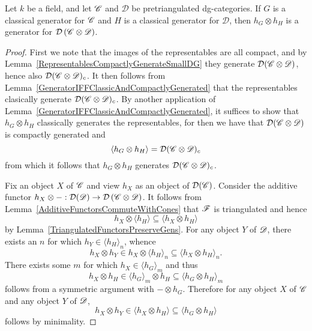 \documentclass[dissertation.tex]{subfiles}
\begin{document}
\begin{thm}
  Let $k$ be a field, and let $\mathscr{C}$ and $\mathscr{D}$ be pretriangulated dg-categories.
  If $G$ is a classical generator for $\mathscr{C}$ and $H$ is a classical generator for $\mathscr{D}$, then $h_G \otimes h_H$ is a generator for $\mathcal{D}\left(\mathscr{C} \otimes \mathscr{D}\right)$.
  
  \begin{proof}
    First we note that the images of the representables are all compact, and by Lemma~\ref{RepresentablesCompactlyGenerateSmallDG} they generate $\mathcal{D}(\mathscr{C} \otimes \mathscr{D})$, hence also $\mathcal{D}(\mathscr{C} \otimes \mathscr{D})_c$.
    It then follows from Lemma~\ref{GeneratorIFFClassicAndCompactlyGenerated} that the representables clasically generate $\mathcal{D}(\mathscr{C} \otimes \mathscr{D})_c$.
    By another application of Lemma~\ref{GeneratorIFFClassicAndCompactlyGenerated}, it suffices to show that $h_G \otimes h_H$ classically generates the representables, for then we have that $\mathcal{D}(\mathscr{C} \otimes \mathscr{D})$ is compactly generated and 
    $$\langle h_G \otimes h_H \rangle = \mathcal{D}(\mathscr{C} \otimes \mathscr{D})_c$$
    from which it follows that $h_G \otimes h_H$ generates $\mathcal{D}(\mathscr{C} \otimes \mathscr{D})_c$.

    Fix an object $X$ of $\mathscr{C}$ and view $h_X$ as an object of $\mathcal{D}(\mathscr{C})$.
    Consider the additive functor $h_X \otimes -: \mathcal{D}(\mathscr{D}) \to \mathcal{D}\left(\mathscr{C} \otimes \mathscr{D}\right)$. %
    It follows from Lemma~\ref{AdditiveFunctorsCommuteWithCones} that $\mathscr{F}$ is triangulated and hence 
    $$h_X \otimes \langle h_H \rangle \subseteq \langle h_X \otimes h_H \rangle$$
    by Lemma~\ref{TriangulatedFunctorsPreserveGens}.
    For any object $Y$ of $\mathscr{D}$, there exists an $n$ for which $h_Y \in \langle h_H \rangle_n$, whence
    $$h_X \otimes h_Y \in h_X \otimes \langle h_H\rangle_n \subseteq \langle h_X \otimes h_H\rangle_n.$$
    There exists some $m$ for which $h_X \in \langle h_G \rangle_m$ and thus
    $$h_X \otimes h_H \in \langle h_G \rangle_m \otimes h_H \subseteq \langle h_G \otimes h_H \rangle_m$$
    follows from a symmetric argument with $- \otimes h_G$.
    Therefore for any object $X$ of $\mathscr{C}$ and any object $Y$ of $\mathscr{D}$,
    $$h_X \otimes h_Y \in \langle h_X \otimes h_H \rangle \subseteq \langle h_G \otimes h_H\rangle$$
    follows by minimality.
  \end{proof}
\end{thm}
\end{document}
